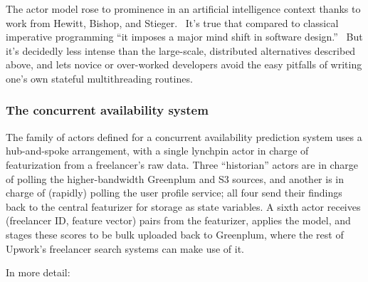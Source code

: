\documentclass[tablecaption=bottom,wcp]{jmlr}
\begin{document}
The actor model rose to prominence in an artificial intelligence context thanks to
work from Hewitt, Bishop, and Stieger.~\cite{hewitt1973ijcai} It's true that compared
to classical imperative programming ``it imposes a major mind shift in software
design.''~\cite{korland2011thesis} But it's decidedly less intense than the 
large-scale, distributed alternatives described above, and lets novice or 
over-worked developers avoid the easy pitfalls of writing one's own 
stateful multithreading routines.

\subsubsection{The concurrent availability system}


The family of actors defined for a concurrent availability prediction system uses a
hub-and-spoke arrangement, with a single lynchpin actor in charge of featurization
from a freelancer's raw data. Three ``historian'' actors are in charge of polling the 
higher-bandwidth Greenplum and S3 sources, and another is in charge of (rapidly)
polling the user profile service; all four send their findings back to the central
featurizer for storage as state variables. A sixth actor receives (freelancer ID, feature
vector) pairs from the featurizer, applies the model, and stages these scores to be
bulk uploaded back to Greenplum, where the rest of Upwork's freelancer search
systems can make use of it.

In more detail:
\end{document}
